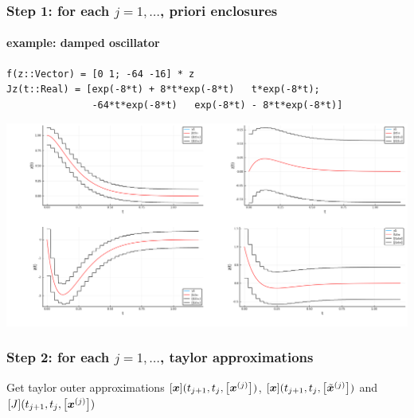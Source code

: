 \documentclass{beamer}
\newcommand{\intervalbox}[1]{\arr{\bm{x}^{(#1)}}}
\newcommand{\tintervalbox}[1]{\arr{\tilde{\bm{x}}^{(#1)}}}
\begin{document}
\begin{frame}[fragile]
    \frametitle{Step 1: for each $j = 1,\ldots$, priori enclosures}
    \framesubtitle{example: damped oscillator}
    
\begin{Verbatim}[fontsize=\small]
f(z::Vector) = [0 1; -64 -16] * z
Jz(t::Real) = [exp(-8*t) + 8*t*exp(-8*t)   t*exp(-8*t);
               -64*t*exp(-8*t)   exp(-8*t) - 8*t*exp(-8*t)]
\end{Verbatim}

    \includegraphics[width=1.0\textwidth]{fixedpoint_J.png}

\end{frame}


\begin{frame}
    \frametitle{Step 2: for each $j = 1,\ldots$, taylor approximations}

    Get taylor outer approximations $[\bm{x}](t_{j+1}, t_j, \intervalbox{j})$, 
    $[\bm{x}](t_{j+1}, t_j, \tintervalbox{j})$ 
    and $[J](t_{j+1}, t_j, \intervalbox{j})$

\end{frame}
\end{document}

